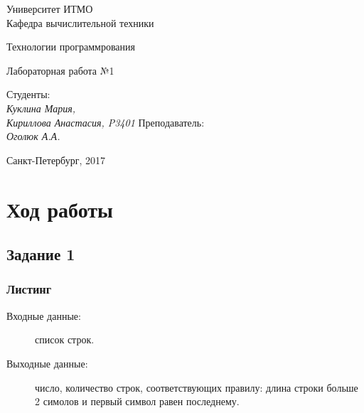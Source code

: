 \documentclass[12pt, a4paper] {ncc}
\begin{document}
\setcounter{figure}{0}
\frenchspacing
\pagestyle{empty}
\begin{center}
                            Университет ИТМО    \\
                        Кафедра вычислительной техники

                    Технологии программрования
\end{center}
\begin{center}
                            Лабораторная работа №1\\
\end{center}
\begin{flushright}
                                    Студенты:\\
                                    {\it Куклина Мария,}\\
                                    {\it Кириллова Анастасия, P3401}
                                    Преподаватель: \\
                                    {\it Оголюк А.А.}
\end{flushright}
\begin{center}
                             Санкт-Петербург, 2017
\end{center}
\newpage

\section{Ход работы}
    \subsection{Задание 1}
        \subsubsection{Листинг}
        \begin{description}
            \item[Входные данные:] список строк.
            \item[Выходные данные:] число, количество строк, соответствующих правилу:
                 длина строки больше 2 симолов и первый символ равен последнему.
        \end{description}
\end{document}
